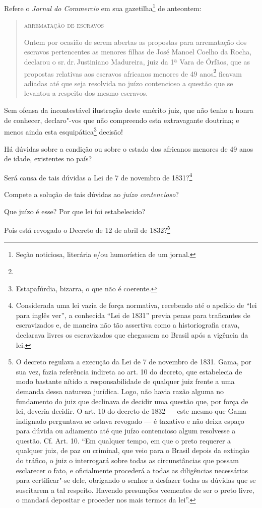 Refere o \emph{Jornal do Commercio} em sua gazetilha\footnote{Seção
  noticiosa, literária e/ou humorística de um jornal.} de anteontem:

\begin{quote}
\textsc{arrematação de escravos}

Ontem por ocasião de serem abertas as propostas para arrematação dos
escravos pertencentes as menores filhas de José Manoel Coelho da Rocha,
declarou o sr.\,dr.\,Justiniano Madureira, juiz da 1ª Vara de Órfãos, que
as propostas relativas aos escravos africanos menores de 49
anos\footnote{} ficavam adiadas até que seja resolvida no juízo
contencioso a questão que se levantou a respeito dos mesmo escravos.
\end{quote}

Sem ofensa da incontestável ilustração deste emérito juiz, que não tenho
a honra de conhecer, declaro"-vos que não compreendo esta extravagante
doutrina; e menos ainda esta esquipática\footnote{Estapafúrdia,
  bizarra, o que não é coerente.} decisão!

Há dúvidas sobre a condição ou sobre o estado dos africanos menores de
49 anos de idade, existentes no país?

Será causa de tais dúvidas a Lei de 7 de novembro de 1831?\footnote{
  Considerada uma lei vazia de força normativa, recebendo até o apelido
  de ``lei para inglês ver'', a conhecida ``Lei de 1831'' previa penas para
  traficantes de escravizados e, de maneira não tão assertiva como a
  historiografia crava, declarava livres os escravizados que chegassem
  ao Brasil após a vigência da lei.}

Compete a solução de tais dúvidas ao \emph{juízo contencioso}?

Que juízo é esse? Por que lei foi estabelecido?

Pois está revogado o Decreto de 12 de abril de 1832?\footnote{O
  decreto regulava a execução da Lei de 7 de novembro de 1831. Gama, por
  sua vez, fazia referência indireta ao art. 10 do decreto, que
  estabelecia de modo bastante nítido a responsabilidade de qualquer
  juiz frente a uma demanda dessa natureza jurídica. Logo, não havia
  razão alguma no fundamento do juiz que declinava de decidir uma
  questão que, por força de lei, deveria decidir. O art. 10 do decreto
  de 1832 --- este mesmo que Gama indignado perguntava se estava revogado
  --- é taxativo e não deixa espaço para dúvida ou adiamento até que juízo
  contencioso algum resolvesse a questão. Cf. Art. 10. ``Em qualquer
  tempo, em que o preto requerer a qualquer juiz, de paz ou criminal,
  que veio para o Brasil depois da extinção do tráfico, o juiz o
  interrogará sobre todas as circunstâncias que possam esclarecer o
  fato, e oficialmente procederá a todas as diligências necessárias para
  certificar"-se dele, obrigando o senhor a desfazer todas as dúvidas que
  se suscitarem a tal respeito. Havendo presunções veementes de ser o
  preto livre, o mandará depositar e proceder nos mais termos da lei''.}

